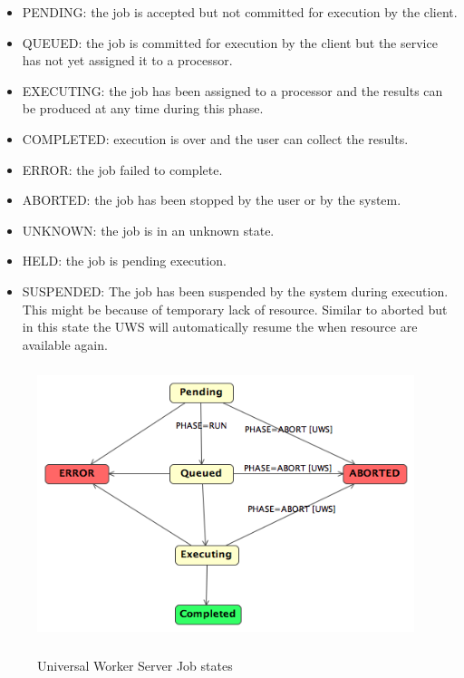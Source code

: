 \begin{itemize}

\item 
    PENDING: the job is accepted but not committed for execution by the client.
\item
    QUEUED: the job is committed for execution by the client but the service has not yet assigned it to a processor.
\item
    EXECUTING: the job has been assigned to a processor and the results can be produced at any time during this phase.
\item
    COMPLETED: execution is over and the user can collect the results.
\item
    ERROR: the job failed to complete.
\item
    ABORTED: the job has been stopped by the user or by the system.
\item
    UNKNOWN: the job is in an unknown state.
\item
    HELD: the job is pending execution.
\item
    SUSPENDED: The job has been suspended by the system during execution. This might be because of temporary lack of resource. Similar to aborted but in this state the UWS will automatically resume the when resource are available again.

\end{itemize}

% 
% 
% 
% 
% 


\begin{figure}[H]
\centering
\includegraphics[width=11cm,height=8cm]{images/UWSStates.png}\\
\caption{Universal Worker Server Job states}
\end{figure}

